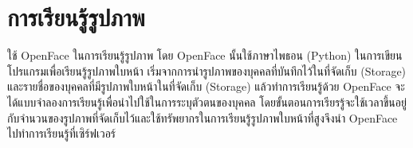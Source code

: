 \section{การเรียนรู้รูปภาพ}
ใช้ OpenFace ในการเรียนรู้รูปภาพ โดย OpenFace นั้นใช้ภาษาไพธอน (Python) ในการเขียนโปรแกรมเพื่อเรียนรู้รูปภาพใบหน้า เริ่มจากการนำรูปภาพของบุคคลที่บันทึกไว้ในที่จัดเก็บ (Storage) 
และรายชื่อของบุคคลที่มีรูปภาพใบหน้าในที่จัดเก็บ (Storage) แล้วทำการเรียนรู้ด้วย OpenFace จะได้แบบจำลองการเรียนรู้เพื่อนำไปใช้ในการระบุตัวตนของบุคคล 
โดยขั้นตอนการเรียรรู้จะใช้เวลาขึ้นอยู่กับจำนวนของรูปภาพที่จัดเก็บไว้และใช้ทรัพยากรในการเรียนรู้รูปภาพใบหน้าที่สูงจึงนำ OpenFace ไปทำการเรียนรู้ที่เซิร์ฟเวอร์


